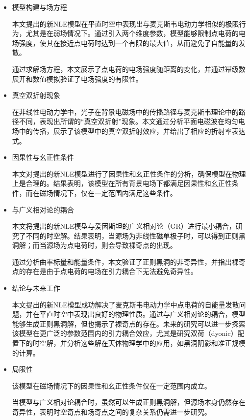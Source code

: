 \documentclass[aps,prl,preprint,groupedaddress]{revtex4-2}
\begin{document}
\begin{itemize}

\item 模型构建与场方程

本文提出的新NLE模型在平直时空中表现出与麦克斯韦电动力学相似的极限行为，尤其是在弱场情况下。通过引入两个维度参数，模型能够限制点电荷的电场强度，使其在接近点电荷时达到一个有限的最大值，从而避免了自能量的发散。

通过求解场方程，本文展示了点电荷的电场强度随距离的变化，并通过幂级数展开和数值模拟验证了电场强度的有限性。

\item 真空双折射现象

在非线性电动力学中，光子在背景电磁场中的传播路径与麦克斯韦理论中的路径不同，表现出所谓的“真空双折射”现象。本文通过分析平面电磁波在均匀电场中的传播，展示了该模型中的真空双折射效应，并给出了相应的折射率表达式。

\item 因果性与幺正性条件

本文对提出的新NLE模型进行了因果性和幺正性条件的分析，确保模型在物理上是合理的。结果表明，该模型在所有背景电场下都满足因果性和幺正性条件，而在磁场情况下，仅在一定范围内满足这些条件。

\item 与广义相对论的耦合

本文将提出的新NLE模型与爱因斯坦的广义相对论（GR）进行最小耦合，研究了不同的时空解。结果表明，当源场为非线性磁单极子时，可以得到正则黑洞解；而当源场为点电荷时，则会导致裸奇点的出现。

通过分析曲率标量和能量条件，本文验证了正则黑洞的非奇异性，并指出裸奇点的存在是由于点电荷的电场在引力耦合下无法避免奇异性。

\item 结论与未来工作

本文提出的新NLE模型成功解决了麦克斯韦电动力学中点电荷的自能量发散问题，并在平直时空中表现出良好的物理性质。通过与广义相对论的耦合，模型能够生成正则黑洞解，但也揭示了裸奇点的存在。未来的研究可以进一步探索该模型在更广泛的参数范围内的引力耦合效应，尤其是研究双荷（dyonic）配置下的时空解，并分析这些解在天体物理学中的应用，如黑洞阴影和准正规模的计算。

\item 局限性

该模型在磁场情况下的因果性和幺正性条件仅在一定范围内成立。

当模型与广义相对论耦合时，虽然可以生成正则黑洞解，但源场本身仍然存在奇异性，表明时空奇点和场奇点之间的复杂关系仍需进一步研究。

\end{itemize}
\end{document}
